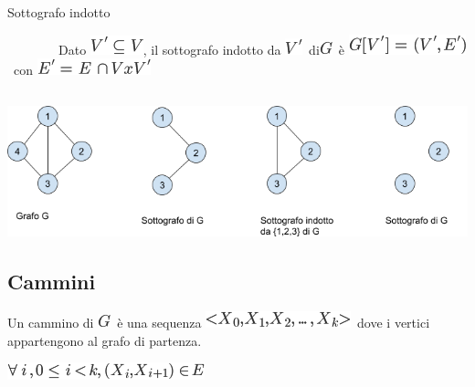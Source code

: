 \documentclass{article}
\begin{document}
{}

{Sottografo indotto }

{~~~~~~~~Dato }\includegraphics{images/image342.png}{, il sottografo
indotto da
}\includegraphics{images/image344.png}{~di}\includegraphics{images/image340.png}{~è
}\includegraphics{images/image345.png}{~con
}\includegraphics{images/image346.png}{~ }

\subsection{\texorpdfstring{{\protect\includegraphics{images/image534.png}}}{}}\label{h.alw0becdzne2}

\hypertarget{h.lxvflhr4q9d8}{\subsection{\texorpdfstring{{Cammini}}{Cammini}}\label{h.lxvflhr4q9d8}}

{Un cammino di }\includegraphics{images/image340.png}{~è una sequenza
}\includegraphics{images/image347.png}{~dove i vertici appartengono al
grafo di partenza. }

\includegraphics{images/image348.png}
\end{document}
